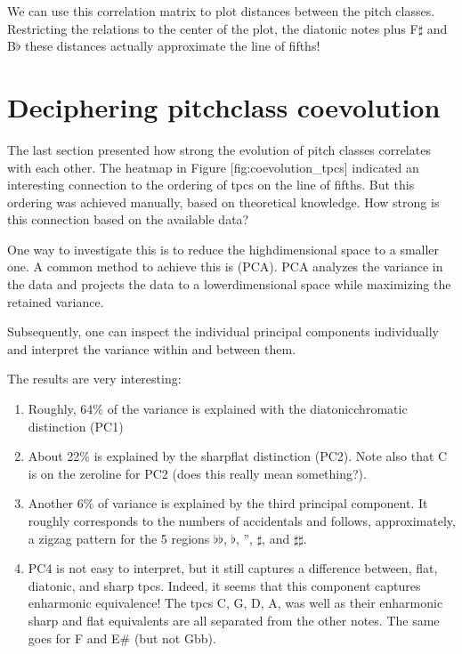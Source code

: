 \documentclass[letterpaper,10pt,english]{sphinxmanual}
\begin{document}
\sphinxAtStartPar
We can use this correlation matrix to plot distances between the pitch
classes. Restricting the relations to the center of the plot, the
diatonic notes plus F\(\sharp\) and B\(\flat\) these
distances actually approximate the line of fifths!


\section{Deciphering pitch\sphinxhyphen{}class coevolution}
\label{\detokenize{5_notes:deciphering-pitch-class-coevolution}}
\sphinxAtStartPar
The last section presented how strong the evolution of pitch classes
correlates with each other. The heatmap in Figure
{[}fig:coevolution\_tpcs{]} indicated an interesting connection to the
ordering of tpcs on the line of fifths. But this ordering was achieved
manually, based on theoretical knowledge. How strong is this connection
based on the available data?

\sphinxAtStartPar
One way to investigate this is to reduce the high\sphinxhyphen{}dimensional space to a
smaller one. A common method to achieve this is  (PCA). PCA analyzes the variance in the data and projects the
data to a lower\sphinxhyphen{}dimensional space while maximizing the retained
variance.

\sphinxAtStartPar
Subsequently, one can inspect the individual principal components
individually and interpret the variance within and between them.

\sphinxAtStartPar
The results are very interesting:
\begin{enumerate}
%
\item {} 
\sphinxAtStartPar
Roughly, 64\% of the variance is explained with the diatonic\sphinxhyphen{}chromatic
distinction (PC1)

\item {} 
\sphinxAtStartPar
About 22\% is explained by the sharp\sphinxhyphen{}flat distinction (PC2). Note also
that C is on the zero\sphinxhyphen{}line for PC2 (does this really mean
something?).

\item {} 
\sphinxAtStartPar
Another 6\% of variance is explained by the third principal component.
It roughly corresponds to the numbers of accidentals and follows,
approximately, a zig\sphinxhyphen{}zag pattern for the 5 regions
\(\flat\flat\), \(\flat\), ”, \(\sharp\), and
\(\sharp\sharp\).

\item {} 
\sphinxAtStartPar
PC4 is not easy to interpret, but it still captures a difference
between, flat, diatonic, and sharp tpcs. Indeed, it seems that this
component captures enharmonic equivalence! The tpcs C, G, D, A, was
well as their enharmonic sharp and flat equivalents are all separated
from the other notes. The same goes for F and E\# (but not Gbb).

\end{enumerate}
\end{document}
